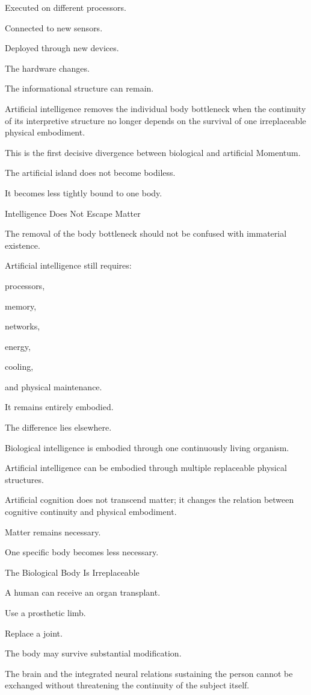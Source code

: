 Executed on different processors.

Connected to new sensors.

Deployed through new devices.

The hardware changes.

The informational structure can remain.

Artificial intelligence removes the individual body bottleneck when the continuity of its interpretive structure no longer depends on the survival of one irreplaceable physical embodiment.

This is the first decisive divergence between biological and artificial Momentum.

The artificial island does not become bodiless.

It becomes less tightly bound to one body.

Intelligence Does Not Escape Matter

The removal of the body bottleneck should not be confused with immaterial existence.

Artificial intelligence still requires:

processors,

memory,

networks,

energy,

cooling,

and physical maintenance.

It remains entirely embodied.

The difference lies elsewhere.

Biological intelligence is embodied through one continuously living organism.

Artificial intelligence can be embodied through multiple replaceable physical structures.

Artificial cognition does not transcend matter; it changes the relation between cognitive continuity and physical embodiment.

Matter remains necessary.

One specific body becomes less necessary.

The Biological Body Is Irreplaceable

A human can receive an organ transplant.

Use a prosthetic limb.

Replace a joint.

The body may survive substantial modification.

The brain and the integrated neural relations sustaining the person cannot be exchanged without threatening the continuity of the subject itself.

